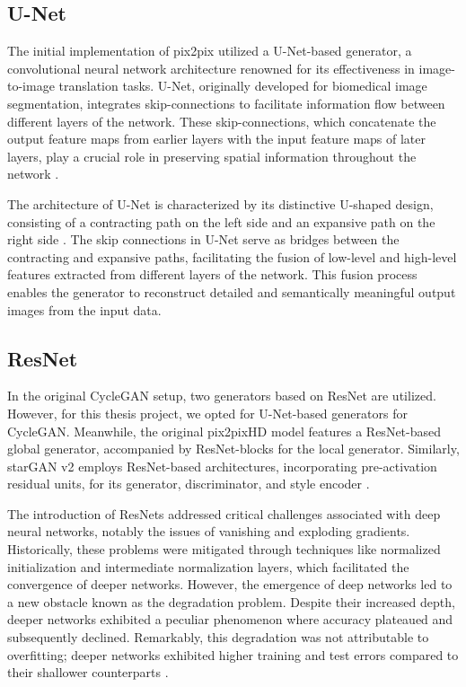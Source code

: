 \documentclass[UKenglish,12pt]{master-style}
\begin{document}
\subsection*{U-Net}

The initial implementation of pix2pix utilized a U-Net-based generator, a convolutional neural network architecture renowned for its effectiveness in image-to-image translation tasks. U-Net, originally developed for biomedical image segmentation, integrates skip-connections to facilitate information flow between different layers of the network. These skip-connections, which concatenate the output feature maps from earlier layers with the input feature maps of later layers, play a crucial role in preserving spatial information throughout the network \cite{ZUNAIR2021104699} .

The architecture of U-Net is characterized by its distinctive U-shaped design, consisting of a contracting path on the left side and an expansive path on the right side \cite{ZUNAIR2021104699} . The skip connections in U-Net serve as bridges between the contracting and expansive paths, facilitating the fusion of low-level and high-level features extracted from different layers of the network. This fusion process enables the generator to reconstruct detailed and semantically meaningful output images from the input data. 

\subsection*{ResNet}

In the original CycleGAN setup, two generators based on ResNet are utilized. However, for this thesis project, we opted for U-Net-based generators for CycleGAN. Meanwhile, the original pix2pixHD model features a ResNet-based global generator, accompanied by ResNet-blocks for the local generator. Similarly, starGAN v2 employs ResNet-based architectures, incorporating pre-activation residual units, for its generator, discriminator, and style encoder \cite{ResNet} .

The introduction of ResNets addressed critical challenges associated with deep neural networks, notably the issues of vanishing and exploding gradients. Historically, these problems were mitigated through techniques like normalized initialization and intermediate normalization layers, which facilitated the convergence of deeper networks. However, the emergence of deep networks led to a new obstacle known as the degradation problem. Despite their increased depth, deeper networks exhibited a peculiar phenomenon where accuracy plateaued and subsequently declined. Remarkably, this degradation was not attributable to overfitting; deeper networks exhibited higher training and test errors compared to their shallower counterparts \cite{ResNet}.
\end{document}

